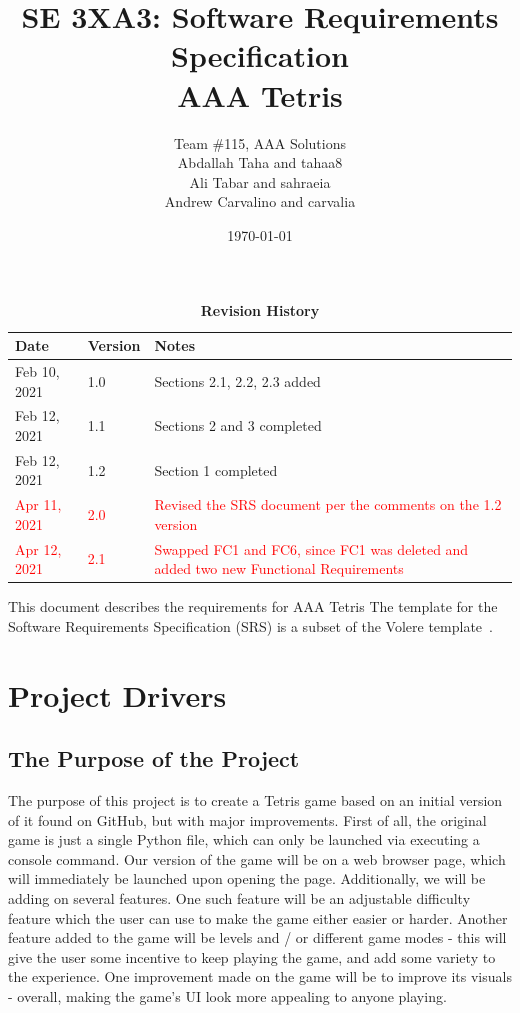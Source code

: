 \documentclass[12pt, titlepage]{article}
\title{SE 3XA3: Software Requirements Specification\\AAA Tetris}
\author{Team \#115, AAA Solutions
		\\ Abdallah Taha and tahaa8
		\\ Ali Tabar and sahraeia
		\\ Andrew Carvalino and carvalia
}
\date{\today}
\begin{document}
\maketitle

\tableofcontents
\listoftables
\listoffigures

\begin{table}[bp]
\caption{\bf Revision History}
\begin{tabularx}{\textwidth}{p{3cm}p{2cm}X}
\toprule {\bf Date} & {\bf Version} & {\bf Notes}\\
\midrule
Feb 10, 2021 & 1.0 & Sections 2.1, 2.2, 2.3 added\\
Feb 12, 2021 & 1.1 & Sections 2 and 3 completed\\
Feb 12, 2021 & 1.2 & Section 1 completed\\
\textcolor{red}{Apr 11, 2021} & \textcolor{red}{2.0} & \textcolor{red}{Revised the SRS document per the comments on the 1.2 version}\\
\textcolor{red}{Apr 12, 2021} & \textcolor{red}{2.1} & \textcolor{red}{Swapped FC1 and FC6, since FC1 was deleted and added two new Functional Requirements} \\
\bottomrule
\end{tabularx}
\end{table}

\newpage


This document describes the requirements for AAA Tetris The template for the Software
Requirements Specification (SRS) is a subset of the Volere
template~\citep{RobertsonAndRobertson2012}.

\section{Project Drivers}

\subsection{The Purpose of the Project}
The purpose of this project is to create a Tetris game based on an initial version of it found on GitHub, but with major improvements. First of all, the original game is just a single Python file, which can only be launched via executing a console command. Our version of the game will be on a web browser page, which will immediately be launched upon opening the page. Additionally, we will be adding on several features. One such feature will be an adjustable difficulty feature which the user can use to make the game either easier or harder. Another feature added to the game will be levels and / or different game modes - this will give the user some incentive to keep playing the game, and add some variety to the experience. 
One improvement made on the game will be to improve its visuals - overall, making the game’s UI look more appealing to anyone playing.
\end{document}
